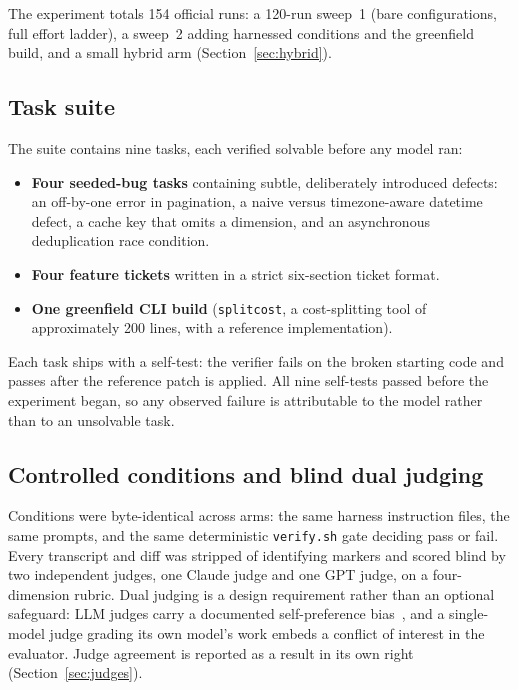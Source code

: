 \documentclass[11pt]{article}
\begin{document}
The experiment totals 154 official runs: a 120-run sweep~1 (bare
configurations, full effort ladder), a sweep~2 adding harnessed conditions
and the greenfield build, and a small hybrid arm
(Section~\ref{sec:hybrid}).

\subsection{Task suite}

The suite contains nine tasks, each verified solvable before any model ran:

\begin{itemize}
  \item \textbf{Four seeded-bug tasks} containing subtle, deliberately
        introduced defects: an off-by-one error in pagination, a naive
        versus timezone-aware datetime defect, a cache key that omits a
        dimension, and an asynchronous deduplication race condition.
  \item \textbf{Four feature tickets} written in a strict six-section ticket
        format.
  \item \textbf{One greenfield CLI build} (\texttt{splitcost}, a
        cost-splitting tool of approximately 200 lines, with a reference
        implementation).
\end{itemize}

Each task ships with a self-test: the verifier fails on the broken starting
code and passes after the reference patch is applied. All nine self-tests
passed before the experiment began, so any observed failure is attributable
to the model rather than to an unsolvable task.

\subsection{Controlled conditions and blind dual judging}

Conditions were byte-identical across arms: the same harness instruction
files, the same prompts, and the same deterministic \texttt{verify.sh} gate
deciding pass or fail. Every transcript and diff was stripped of
identifying markers and scored blind by two independent judges, one Claude
judge and one GPT judge, on a four-dimension rubric. Dual judging is a
design requirement rather than an optional safeguard: LLM judges carry a
documented self-preference bias~\cite{wataoka2024selfpreference}, and a
single-model judge grading its own model's work embeds a conflict of
interest in the evaluator. Judge agreement is reported as a result in its
own right (Section~\ref{sec:judges}).
\end{document}
